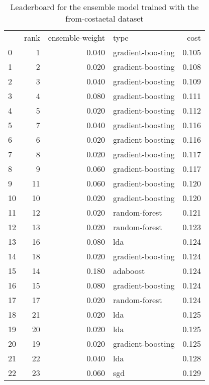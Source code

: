 \begin{table}[]
	\centering
	\begin{tabular}{lrrlr}
		   & rank & ensemble-weight & type              & cost  \\
		0  & 1    & 0.040           & gradient-boosting & 0.105 \\
		1  & 2    & 0.020           & gradient-boosting & 0.108 \\
		2  & 3    & 0.040           & gradient-boosting & 0.109 \\
		3  & 4    & 0.080           & gradient-boosting & 0.111 \\
		4  & 5    & 0.020           & gradient-boosting & 0.112 \\
		5  & 7    & 0.040           & gradient-boosting & 0.116 \\
		6  & 6    & 0.020           & gradient-boosting & 0.116 \\
		7  & 8    & 0.020           & gradient-boosting & 0.117 \\
		8  & 9    & 0.060           & gradient-boosting & 0.117 \\
		9  & 11   & 0.060           & gradient-boosting & 0.120 \\
		10 & 10   & 0.020           & gradient-boosting & 0.120 \\
		11 & 12   & 0.020           & random-forest     & 0.121 \\
		12 & 13   & 0.020           & random-forest     & 0.123 \\
		13 & 16   & 0.080           & lda               & 0.124 \\
		14 & 18   & 0.020           & gradient-boosting & 0.124 \\
		15 & 14   & 0.180           & adaboost          & 0.124 \\
		16 & 15   & 0.080           & gradient-boosting & 0.124 \\
		17 & 17   & 0.020           & random-forest     & 0.124 \\
		18 & 21   & 0.020           & lda               & 0.125 \\
		19 & 20   & 0.020           & lda               & 0.125 \\
		20 & 19   & 0.020           & gradient-boosting & 0.125 \\
		21 & 22   & 0.040           & lda               & 0.128 \\
		22 & 23   & 0.060           & sgd               & 0.129 \\
	\end{tabular}

	\caption{Leaderboard for the ensemble model trained with the from-costaetal dataset}
	\label{tab:lb-from-costaetal-randsplit}
\end{table}

